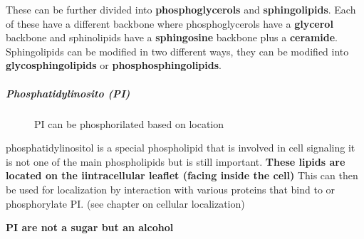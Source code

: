 \documentclass[../main.tex]{subfiles}
\begin{document}
        These can be further divided into \textbf{\gls{phosphoglycerols}} and \textbf{\gls{sphingolipids}}. Each of these have a different backbone where phosphoglycerols have a \textbf{ glycerol} backbone and sphinolipids have a \textbf{sphingosine} backbone plus a \textbf{ceramide}. Sphingolipids can be modified in two different ways, they can be modified into \textbf{glycosphingolipids} or \textbf{phosphosphingolipids}.

        \subparagraph{Phosphatidylinosito (PI)}
        \begin{figure}[H]
            \centering
            \hspace{0.05\textwidth} %
            \caption{PI can be phosphorilated based on location}
            \label{fig:ITC_all}
        \end{figure}
        
        \gls{phosphatidylinositol} is a special phospholipid that is involved in cell signaling it is not one of the main phospholipids but is still important. \textbf{These lipids are located on the iintracellular leaflet (facing inside the cell) }  This can then be used for localization by interaction with various proteins that bind to or phosphorylate PI. (see chapter on cellular localization)
        \begin{remark}
          \textbf{  PI are not a sugar but an alcohol}
        \end{remark}
        
\end{document}
